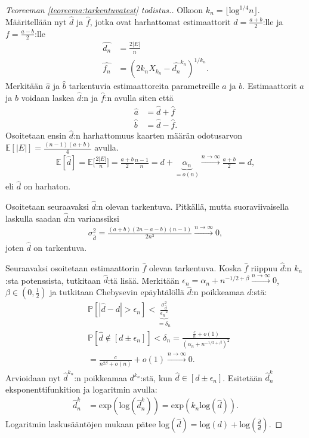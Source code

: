 \documentclass[finnish,12pt,a4paper,pdftex,sci,utf8]{aaltothesis}
\newcommand\floor[1]{\lfloor#1\rfloor}
\begin{document}
\begin{proof}[Teoreeman \ref{teoreema:tarkentuvatest} todistus.]
	Olkoon $k_n = \floor{\text{log}^{1/4}n}$. Määritellään nyt $\hat{d}$ ja $\hat{f}$, jotka ovat harhattomat estimaattorit $d = \frac{a+b}{2}$:lle ja $f = \frac{a-b}{2}$:lle
	\begin{align*}
		\hat{d_n} &= \frac{2\left|E\right|}{n} \\
		\hat{f_n} &= (2 k_n X_{k_{n}} - \hat{d_n}^{k_n})^{1/k_n}.
	\end{align*}
Merkitään $\hat{a}$ ja $\hat{b}$ tarkentuvia estimaattoreita parametreille $a$ ja $b$. Estimaattorit $a$ ja $b$ voidaan laskea $\hat{d}$:n ja $\hat{f}$:n avulla siten että 
	\begin{align*}
		\hat{a} &= \hat{d} + \hat{f} \\
		\hat{b} &= \hat{d} - \hat{f}.
	\end{align*}
	Osoitetaan ensin $\hat{d}$:n harhattomuus kaarten määrän odotusarvon $\mathbb{E}[|E|] = \frac{(n-1)(a+b)}{4}$ avulla.
	\begin{align*}
		\mathbb{E}[\hat{d}] = \mathbb{E}\bigg[ \frac{2|E|}{n} \bigg] = \frac{a+b}{2}\frac{n-1}{n} = d + \underbrace{\alpha_n}_{= o(n)} \xrightarrow{n \rightarrow \infty}\frac{a+b}{2} = d,
	\end{align*}
	eli $\hat{d}$ on harhaton.

	Osoitetaan seuraavaksi $\hat{d}$:n olevan tarkentuva. Pitkällä, mutta suoraviivaisella laskulla saadan $\hat{d}$:n varianssiksi 
	\begin{align*}
		\sigma_{\hat{d}}^2 = \frac{(a+b)(2n-a-b)(n-1)}{2n^3} \xrightarrow{n \rightarrow \infty} 0,
	\end{align*}
	joten $\hat{d}$ on tarkentuva.

	Seuraavaksi osoitetaan estimaattorin $\hat{f}$ olevan tarkentuva. Koska $\hat{f}$ riippuu $\hat{d}$:n $k_n$:sta potenssista, tutkitaan $\hat{d}$:tä lisää. Merkitään $\epsilon_{n}^{} = \alpha_n + n^{-1/2 + \beta} \xrightarrow{n \rightarrow \infty} 0 $, $\beta \in (0,\frac{1}{2})$ ja tutkitaan Chebysevin epäyhtälöllä $\hat{d}$:n poikkeamaa $d$:stä:
	\begin{align*}
		&\mathbb{P}[|\hat{d} - d| > \epsilon_{n}^{}] < \underbrace{\frac{\sigma_{\hat{d}}^2}{{\epsilon_{n}^{}}^2}}_{ = \delta_n} \\
		&\mathbb{P}[\hat{d} \notin [d \pm  \epsilon_{n}^{}]] < \delta_n = \frac{\frac{c}{n} + o(1)}{(\alpha_n + n^{-1/2 + \beta})^2} \\
		&= \frac{c}{{n^{2 \beta}} +  o(n)} + o(1) \xrightarrow{n \rightarrow \infty} 0.
	\end{align*}
	Arvioidaan nyt $\hat{d}^{k_n}$:n poikkeamaa $d^{k_n}$:stä, kun $\hat{d} \in [d \pm \epsilon_{n}^{}]$.
	Esitetään $\hat{d}^k_n$ eksponenttifunkition ja logaritmin avulla:
	\begin{align*}
		\hat{d}^k_n &= \text{exp}(\text{log}(\hat{d}^k_n)) = \text{exp}(k_n \text{log}(\hat{d})).
	\end{align*}
	Logaritmin laskusääntöjen mukaan pätee $\text{log}(\hat{d}) = \text{log}(d) + \text{log}(\frac{\hat{d}}{d})$.


\end{proof}
\end{document}
